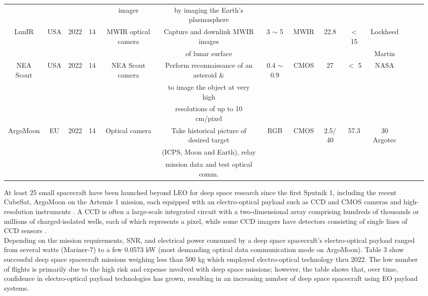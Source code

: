 \documentclass[final,5p,times,twocolumn,authoryear]{elsarticle}
\begin{document}
\begin{table}
{\begin{tabular}{c c c c c c c c c c c c c c}
			& & & & imager & by imaging the Earth’s plasmasphere & & & & & &  &\\
			LunIR & USA & 2022 & 14 & MWIR optical camera & Capture and downlink MWIR images &  3 $\sim$ 5 & MWIR & 22.8 & $<$ 15 &   Lockheed & \citep{martinez2021advanced, crusan2019nasa}\\
			& & & & & of lunar surface & & & & &   Martin &\\
			NEA Scout & USA & 2022 & 14 & NEA Scout camera & Perform reconnaissance of an asteroid $\&$ & 0.4 $\sim$ 0.9 & CMOS & 27 & $<$ 5   & NASA & \citep{johnson2022near, mcnutt2014near}\\
			& & & & & to image the object at very high & & & & & & & \\
			& & & & & resolutions of up to 10 cm/pixel & & & & & & &&\\
			ArgoMoon & EU & 2022 & 14 & Optical camera & Take historical picture of desired target  & RGB & CMOS & 2.5/ 40 & 57.3 & 30   Argotec & \citep{di2019argomoon, molli2023design}\\
			& & & & & (ICPS, Moon and Earth), relay & & & & & & &\\
			& & & & &   mission data and test optical comm.  & & & & &  & &\\
			\hline
		\end{tabular}
	}
\end{table}
At least 25 small spacecraft have been launched beyond LEO for deep space research since the first Sputnik 1, including the recent CubeSat, ArgoMoon on the Artemis 1 mission, each equipped with an electro-optical payload such as CCD and CMOS cameras and high-resolution instruments \citep{hambleton2016international}. A CCD is often a large-scale integrated circuit with a two-dimensional array comprising hundreds of thousands or millions of charged-isolated wells, each of which represents a pixel, while some CCD imagers have detectors consisting of single lines of CCD sensors \citep{nas2023}. \\
Depending on the mission requirements, SNR, and electrical power consumed by a deep space spacecraft's electro-optical payload ranged from several watts (Mariner-7) to a few 0.0573 kW \citep{di2019argomoon} (most demanding optical data communication mode on ArgoMoon). Table 3 show successful deep space spacecraft missions weighing less than 500 kg which employed electro-optical technology thru 2022. The low number of flights is primarily due to the high risk and expense involved with deep space missions; however, the table shows that, over time, confidence in electro-optical payload technologies has grown, resulting in an increasing number of deep space spacecraft using EO payload systems.\\
\end{document}
